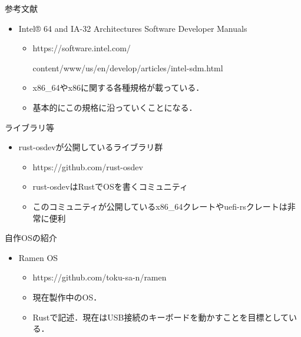 \documentclass[titlepage,dvipdfmx,uplatex,a4j,12pt]{beamer}
\begin{document}
\begin{frame}{参考文献}
    \begin{itemize}
        \item Intel® 64 and IA-32 Architectures Software Developer Manuals
            \begin{itemize}
                \item https://software.intel.com/

                    content/www/us/en/develop/articles/intel-sdm.html
                \item x86\_64やx86に関する各種規格が載っている．
                \item 基本的にこの規格に沿っていくことになる．
            \end{itemize}
    \end{itemize}
\end{frame}

\begin{frame}{ライブラリ等}
    \begin{itemize}
        \item rust-osdevが公開しているライブラリ群
            \begin{itemize}
                \item https://github.com/rust-osdev
                \item rust-osdevはRustでOSを書くコミュニティ
                \item このコミュニティが公開しているx86\_64クレートやuefi-rsクレートは非常に便利
            \end{itemize}
    \end{itemize}
\end{frame}

\begin{frame}{自作OSの紹介}
    \begin{itemize}
        \item Ramen OS
            \begin{itemize}
                \item https://github.com/toku-sa-n/ramen
                \item 現在製作中のOS．
                \item Rustで記述．現在はUSB接続のキーボードを動かすことを目標としている．
            \end{itemize}
    \end{itemize}
\end{frame}
\end{document}
